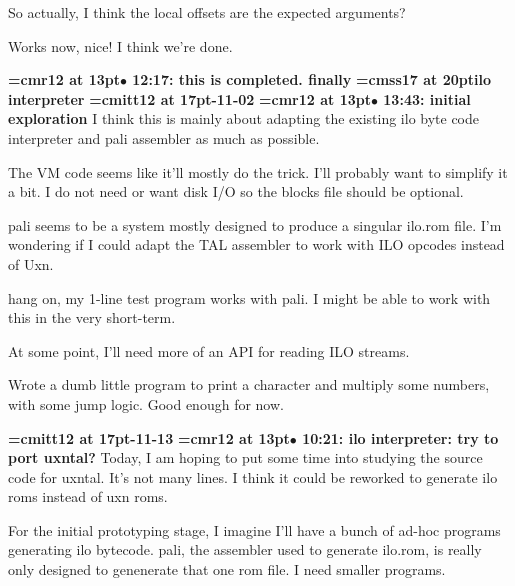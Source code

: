 So actually, I think the local offsets are the expected arguments?
\par

Works now, nice! I think we're done.
\par

{\smallskip\noindent\bf\font\titlefont=cmr12 at 13pt\titlefont $\bullet$ 12:17: this is completed. finally}\smallskip
{}
{\medskip\noindent\bf\font\titlefont=cmss17 at 20pt\titlefont ilo interpreter}\medskip
{\medskip\noindent\bf\font\titlefont=cmitt12 at 17pt-11-02}\medskip
{\smallskip\noindent\bf\font\titlefont=cmr12 at 13pt\titlefont $\bullet$ 13:43: initial exploration}\smallskip
I think this is mainly about adapting the existing ilo byte code interpreter and pali assembler as much as possible.
\par

The VM code seems like it'll mostly do the trick. I'll probably want to simplify it a bit. I do not need or want disk I/O so the blocks file should be optional.
\par

pali seems to be a system mostly designed to produce a singular ilo.rom file. I'm wondering if I could adapt the TAL assembler to work with ILO opcodes instead of Uxn.
\par

hang on, my 1-line test program works with pali. I might be able to work with this in the very short-term.
\par

At some point, I'll need more of an API for reading ILO streams.
\par

Wrote a dumb little program to print a character and multiply some numbers, with some jump logic. Good enough for now.
\par

{\medskip\noindent\bf\font\titlefont=cmitt12 at 17pt-11-13}\medskip
{\smallskip\noindent\bf\font\titlefont=cmr12 at 13pt\titlefont $\bullet$ 10:21: ilo interpreter: try to port uxntal?}\smallskip
Today, I am hoping to put some time into studying the source code for uxntal. It's not many lines. I think it could be reworked to generate ilo roms instead of uxn roms.
\par

For the initial prototyping stage, I imagine I'll have a bunch of ad-hoc programs generating ilo bytecode. pali, the assembler used to generate ilo.rom, is really only designed to genenerate that one rom file. I need smaller programs.
\par


